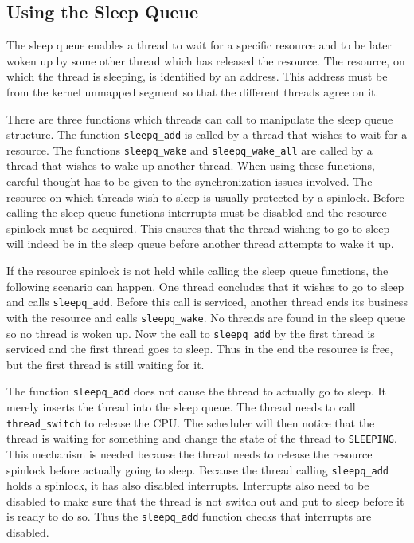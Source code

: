 \documentclass[twoside,a4paper]{report}
\begin{document}
\subsection{Using the Sleep Queue}

The sleep queue enables a thread to wait for a specific resource and
to be later woken up by some other thread which has released the
resource. The resource, on which the thread is sleeping, is identified
by an address. This address must be from the kernel unmapped segment
so that the different threads agree on it.

There are three functions which threads can call to manipulate the
sleep queue structure. The function \texttt{sleepq\_add}
 is called by a thread that
wishes to wait for a resource. The functions \texttt{sleepq\_wake}
 and
\texttt{sleepq\_wake\_all}
 are called by a
thread that wishes to wake up another thread. When using these
functions, careful thought has to be given to the synchronization
issues involved. The resource on which threads wish to sleep is
usually protected by a spinlock. Before calling the sleep queue
functions interrupts must be disabled and the resource spinlock must
be acquired. This ensures that the thread wishing to go to sleep will
indeed be in the sleep queue before another thread attempts to wake it
up.

If the resource spinlock is not held while calling the sleep queue
functions, the following scenario can happen. One thread concludes
that it wishes to go to sleep and calls \texttt{sleepq\_add}. Before
this call is serviced, another thread ends its business with the
resource and calls \texttt{sleepq\_wake}. No threads are found in the
sleep queue so no thread is woken up. Now the call to
\texttt{sleepq\_add} by the first thread is serviced and the first
thread goes to sleep. Thus in the end the resource is free, but the
first thread is still waiting for it.

The function \texttt{sleepq\_add} does not cause the thread to
actually go to sleep. It merely inserts the thread into the sleep
queue. The thread needs to call \texttt{thread\_switch}
 to release the CPU. The
scheduler will then notice that the thread is waiting for something
and change the state of the thread to \texttt{SLEEPING}. This mechanism
is needed because the thread needs to release the resource spinlock
before actually going to sleep. Because the thread calling
\texttt{sleepq\_add} holds a spinlock, it has also disabled
interrupts. Interrupts also need to be disabled to make sure that the
thread is not switch out and put to sleep before it is ready to do so.
Thus the \texttt{sleepq\_add} function checks that interrupts are
disabled.
\end{document}
